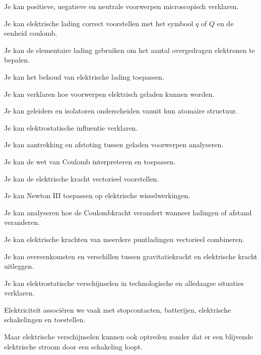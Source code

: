 \documentclass{ximera}
\begin{document}
\begin{leerdoelen}
  \item Je kan positieve, negatieve en neutrale voorwerpen
        microscopisch verklaren.
  \item Je kan elektrische lading correct voorstellen met het symbool
        $q$ of $Q$ en de eenheid coulomb.
  \item Je kan de elementaire lading gebruiken om het aantal
        overgedragen elektronen te bepalen.
  \item Je kan het behoud van elektrische lading toepassen.
  \item Je kan verklaren hoe voorwerpen elektrisch geladen kunnen
        worden.
  \item Je kan geleiders en isolatoren onderscheiden vanuit hun
        atomaire structuur.
  \item Je kan elektrostatische influentie verklaren.
  \item Je kan aantrekking en afstoting tussen geladen voorwerpen
        analyseren.
  \item Je kan de wet van Coulomb interpreteren en toepassen.
  \item Je kan de elektrische kracht vectorieel voorstellen.
  \item Je kan Newton III toepassen op elektrische wisselwerkingen.
  \item Je kan analyseren hoe de Coulombkracht verandert wanneer
        ladingen of afstand veranderen.
  \item Je kan elektrische krachten van meerdere puntladingen
        vectorieel combineren.
  \item Je kan overeenkomsten en verschillen tussen gravitatiekracht
        en elektrische kracht uitleggen.
  \item Je kan elektrostatische verschijnselen in technologische en
        alledaagse situaties verklaren.
\end{leerdoelen}




Elektriciteit associëren we vaak met stopcontacten, batterijen,
elektrische schakelingen en toestellen.

Maar elektrische verschijnselen kunnen ook optreden zonder dat er een
blijvende elektrische stroom door een schakeling loopt.
\end{document}
